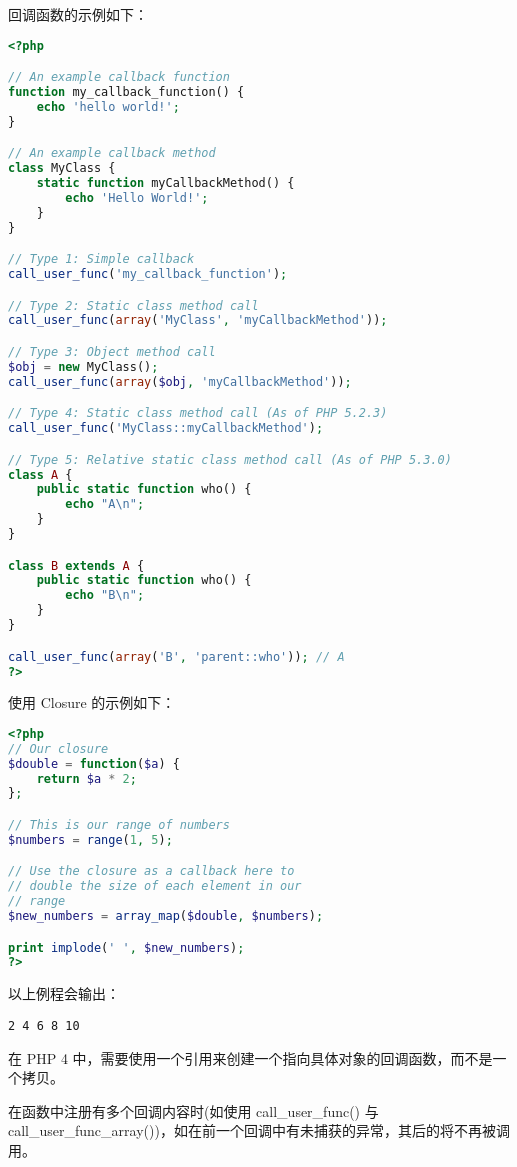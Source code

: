 回调函数的示例如下：

\begin{lstlisting}[language=PHP]
<?php 

// An example callback function
function my_callback_function() {
    echo 'hello world!';
}

// An example callback method
class MyClass {
    static function myCallbackMethod() {
        echo 'Hello World!';
    }
}

// Type 1: Simple callback
call_user_func('my_callback_function'); 

// Type 2: Static class method call
call_user_func(array('MyClass', 'myCallbackMethod')); 

// Type 3: Object method call
$obj = new MyClass();
call_user_func(array($obj, 'myCallbackMethod'));

// Type 4: Static class method call (As of PHP 5.2.3)
call_user_func('MyClass::myCallbackMethod');

// Type 5: Relative static class method call (As of PHP 5.3.0)
class A {
    public static function who() {
        echo "A\n";
    }
}

class B extends A {
    public static function who() {
        echo "B\n";
    }
}

call_user_func(array('B', 'parent::who')); // A
?>
\end{lstlisting}

 使用 Closure 的示例如下：
 
 
\begin{lstlisting}[language=PHP]
<?php
// Our closure
$double = function($a) {
    return $a * 2;
};

// This is our range of numbers
$numbers = range(1, 5);

// Use the closure as a callback here to 
// double the size of each element in our 
// range
$new_numbers = array_map($double, $numbers);

print implode(' ', $new_numbers);
?>
\end{lstlisting}

以上例程会输出：

\begin{verbatim}
2 4 6 8 10
\end{verbatim}


在 PHP 4 中，需要使用一个引用来创建一个指向具体对象的回调函数，而不是一个拷贝。

在函数中注册有多个回调内容时(如使用 call\_user\_func() 与 call\_user\_func\_array())，如在前一个回调中有未捕获的异常，其后的将不再被调用。


